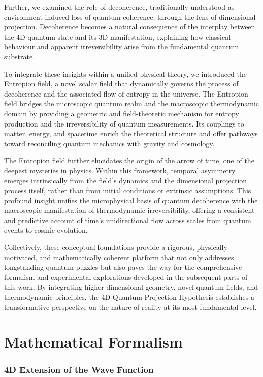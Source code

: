 \documentclass[12pt]{article}
\begin{document}
Further, we examined the role of decoherence, traditionally understood as environment-induced loss of quantum coherence, through the lens of dimensional projection. Decoherence becomes a natural consequence of the interplay between the 4D quantum state and its 3D manifestation, explaining how classical behaviour and apparent irreversibility arise from the fundamental quantum substrate.

To integrate these insights within a unified physical theory, we introduced the Entropion field, a novel scalar field that dynamically governs the process of decoherence and the associated flow of entropy in the universe. The Entropion field bridges the microscopic quantum realm and the macroscopic thermodynamic domain by providing a geometric and field-theoretic mechanism for entropy production and the irreversibility of quantum measurements. Its couplings to matter, energy, and spacetime enrich the theoretical structure and offer pathways toward reconciling quantum mechanics with gravity and cosmology.

The Entropion field further elucidates the origin of the arrow of time, one of the deepest mysteries in physics. Within this framework, temporal asymmetry emerges intrinsically from the field’s dynamics and the dimensional projection process itself, rather than from initial conditions or extrinsic assumptions. This profound insight unifies the microphysical basis of quantum decoherence with the macroscopic manifestation of thermodynamic irreversibility, offering a consistent and predictive account of time’s unidirectional flow across scales from quantum events to cosmic evolution.

Collectively, these conceptual foundations provide a rigorous, physically motivated, and mathematically coherent platform that not only addresses longstanding quantum puzzles but also paves the way for the comprehensive formalism and experimental explorations developed in the subsequent parts of this work. By integrating higher-dimensional geometry, novel quantum fields, and thermodynamic principles, the 4D Quantum Projection Hypothesis establishes a transformative perspective on the nature of reality at its most fundamental level.


\part{Mathematical Formalism}

\section{4D Extension of the Wave Function}
\end{document}
